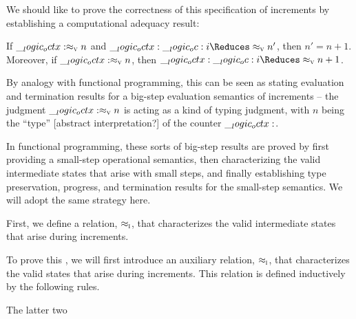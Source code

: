 

We should like to prove the correctness of this specification of increments by establishing a computational adequacy result:
%
\begin{theorem}\label{thm:ordered-rewriting:binary-counter:inc-adequacy}
  If $\__logic_octx: \approx\sb{\text{\normalfont\scshape v}} n$ and $\octx \oc i \Reduces\aval{}{n'}$, then $n' = n+1$.
  Moreover, if $\__logic_octx: \approx\sb{\text{\normalfont\scshape v}} n$, then $\octx \oc i \Reduces\aval{}{n+1}$.
\end{theorem}
%
By analogy with functional programming, this  can be seen as stating evaluation and termination results for a big-step evaluation semantics of increments --
the judgment $\__logic_octx: \approx\sb{\text{\normalfont\scshape v}} n$ is acting as a kind of typing judgment, with $n$ being the \enquote{type} [abstract interpretation?] of the counter $\__logic_octx:$.

In functional programming, these sorts of big-step results are proved by first providing a small-step operational semantics, then characterizing the valid intermediate states that arise with small steps, and finally establishing type preservation, progress, and termination results for the small-step semantics.
We will adopt the same strategy here.

First, we define a relation, $ \approx\sb{\text{\normalfont\scshape i}} $, that characterizes the valid intermediate states that arise during increments.

To prove this , we will first introduce an auxiliary relation, $ \approx\sb{\text{\normalfont\scshape i}} $, that characterizes the valid states that arise during increments.
This relation is defined inductively by the following rules.
%
The latter two


